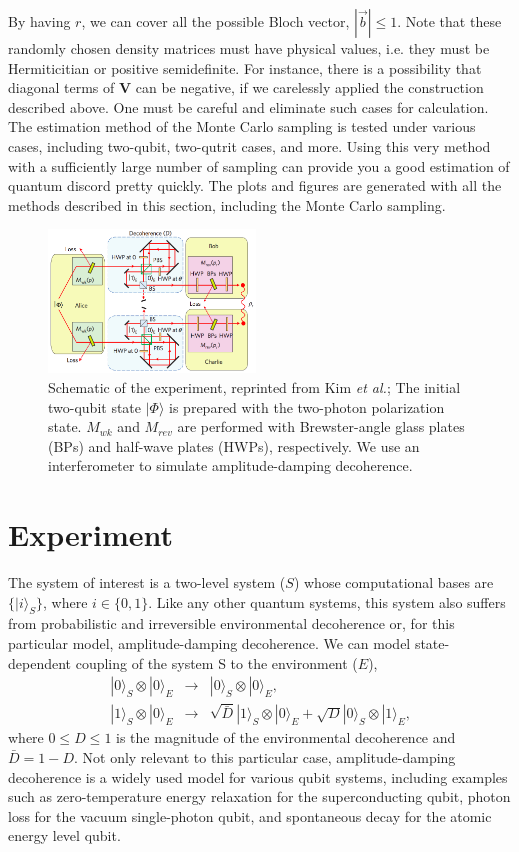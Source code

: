 \documentclass[%
 reprint,
 amsmath,amssymb,
 aps,
]{revtex4-1}
\begin{document}
\noindent By having $r$, we can cover all the possible Bloch vector, $|\vec{b}| \le 1$. Note that these randomly chosen density matrices must have physical values, i.e. they must be Hermiticitian or positive semidefinite. For instance, there is a possibility that diagonal terms of $\textbf{V}$ can be negative, if we carelessly applied the construction described above. One must be careful and eliminate such cases for calculation. The estimation method of the Monte Carlo sampling is tested under various cases, including two-qubit, two-qutrit cases, and more. Using this very method with a sufficiently large number of sampling can provide you a good estimation of quantum discord pretty quickly. The plots and figures are generated with all the methods described in this section, including the Monte Carlo sampling. 

\begin{figure}
        \centering
        \includegraphics[width=0.49\textwidth]{setup}
        \caption{Schematic of the experiment, reprinted from Kim \textit{et al.}; The initial two-qubit state $|\Phi\rangle$ is prepared with the two-photon polarization state. $M_{wk}$ and $M_{rev}$ are performed with Brewster-angle glass plates (BPs) and half-wave plates (HWPs), respectively. We use an interferometer to simulate amplitude-damping decoherence.}\label{fig:setup}
\end{figure}

\section{Experiment}
\noindent The system of interest is a two-level system ($S$) whose computational bases are $\{|i\rangle_S\}$, where $i \in \{0,1\}$. Like any other quantum systems, this system also suffers from probabilistic and irreversible environmental decoherence or, for this particular model, amplitude-damping decoherence. We can model state-dependent coupling of the system S to the environment ($E$),
\begin{eqnarray}
|0\rangle_S \otimes |0\rangle_E  & \rightarrow & |0\rangle_S \otimes |0\rangle_E \text{,} \\
|1\rangle_S \otimes |0\rangle_E  & \rightarrow & \sqrt{\bar{D}} |1\rangle_S \otimes |0\rangle_E + \sqrt{D} |0\rangle_S \otimes |1\rangle_E \text{,}
\end{eqnarray}
\noindent where $0 \le D \le 1$ is the magnitude of the environmental decoherence and $\bar{D}=1-D$. Not only relevant to this particular case, amplitude-damping decoherence is a widely used model for various qubit systems, including examples such as zero-temperature energy relaxation for the superconducting qubit, photon loss for the vacuum single-photon qubit, and spontaneous decay for the atomic energy level qubit.
\end{document}
